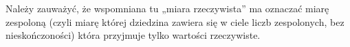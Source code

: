 \documentclass[a4paper,11pt]{article}
\begin{document}
\vspace{\spaceTwo}













\newpage


\vspace{0em}



\vspace{0em}


\noindent
{} Należy zauważyć, że wspomniana tu „miara rzeczywista” ma oznaczać
miarę zespoloną (czyli miarę której dziedzina zawiera się w ciele liczb
zespolonych, bez nieskończoności) która przyjmuje tylko wartości
rzeczywiste.





\newpage

\end{document}
